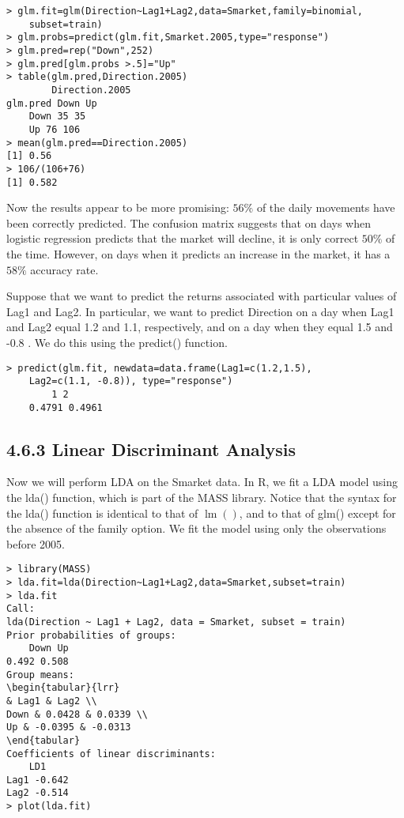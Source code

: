 \documentclass[10pt]{article}
\begin{document}
\begin{verbatim}
> glm.fit=glm(Direction~Lag1+Lag2,data=Smarket,family=binomial,
    subset=train)
> glm.probs=predict(glm.fit,Smarket.2005,type="response")
> glm.pred=rep("Down",252)
> glm.pred[glm.probs >.5]="Up"
> table(glm.pred,Direction.2005)
        Direction.2005
glm.pred Down Up
    Down 35 35
    Up 76 106
> mean(glm.pred==Direction.2005)
[1] 0.56
> 106/(106+76)
[1] 0.582
\end{verbatim}

Now the results appear to be more promising: $56 \%$ of the daily movements have been correctly predicted. The confusion matrix suggests that on days when logistic regression predicts that the market will decline, it is only correct $50 \%$ of the time. However, on days when it predicts an increase in the market, it has a $58 \%$ accuracy rate.

Suppose that we want to predict the returns associated with particular values of Lag1 and Lag2. In particular, we want to predict Direction on a day when Lag1 and Lag2 equal 1.2 and 1.1, respectively, and on a day when they equal 1.5 and -0.8 . We do this using the predict() function.


\begin{verbatim}
> predict(glm.fit, newdata=data.frame(Lag1=c(1.2,1.5),
    Lag2=c(1.1, -0.8)), type="response")
        1 2
    0.4791 0.4961
\end{verbatim}

\subsection*{4.6.3 Linear Discriminant Analysis}
Now we will perform LDA on the Smarket data. In R, we fit a LDA model using the lda() function, which is part of the MASS library. Notice that the syntax for the lda() function is identical to that of $\operatorname{lm}()$, and to that of glm() except for the absence of the family option. We fit the model using only the observations before 2005.

\begin{verbatim}
> library(MASS)
> lda.fit=lda(Direction~Lag1+Lag2,data=Smarket,subset=train)
> lda.fit
Call:
lda(Direction ~ Lag1 + Lag2, data = Smarket, subset = train)
Prior probabilities of groups:
    Down Up
0.492 0.508
Group means:
\begin{tabular}{lrr} 
& Lag1 & Lag2 \\
Down & 0.0428 & 0.0339 \\
Up & -0.0395 & -0.0313
\end{tabular}
Coefficients of linear discriminants:
    LD1
Lag1 -0.642
Lag2 -0.514
> plot(lda.fit)
\end{verbatim}
\end{document}
